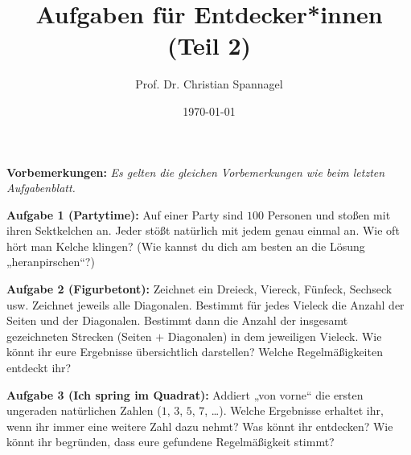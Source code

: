 \documentclass{../cssheet}
\title{Aufgaben für Entdecker*innen (Teil 2)}
\author{Prof. Dr. Christian Spannagel}
\date{\today}
\begin{document}
\printtitle

\textbf{Vorbemerkungen:} 
\emph{Es gelten die gleichen Vorbemerkungen wie beim letzten Aufgabenblatt.}


\textbf{Aufgabe 1 (Partytime):}  Auf einer Party sind $100$ Personen und stoßen mit ihren Sektkelchen an. Jeder stößt natürlich mit jedem genau einmal an. Wie oft hört man Kelche klingen? (Wie kannst du dich am besten an die Lösung „heranpirschen“?) 

\textbf{Aufgabe 2 (Figurbetont):}  Zeichnet ein Dreieck, Viereck, Fünfeck, Sechseck usw. Zeichnet jeweils alle Diagonalen. Bestimmt für jedes Vieleck die Anzahl der Seiten und der Diagonalen. Bestimmt dann die Anzahl der insgesamt gezeichneten Strecken (Seiten $+$ Diagonalen) in dem jeweiligen Vieleck. Wie könnt ihr eure Ergebnisse übersichtlich darstellen? Welche Regelmäßigkeiten entdeckt ihr? 

\textbf{Aufgabe 3 (Ich spring im Quadrat):} Addiert „von vorne“ die ersten ungeraden natürlichen Zahlen ($1$, $3$, $5$, $7$, …). Welche Ergebnisse erhaltet ihr, wenn ihr immer eine weitere Zahl dazu nehmt? Was könnt ihr entdecken? Wie könnt ihr begründen, dass eure gefundene Regelmäßigkeit stimmt? 

\vspace*{10mm}

\printlicense

\printsocials
\end{document}
